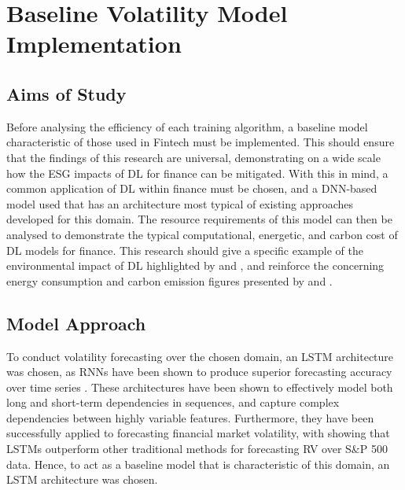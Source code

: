 \documentclass[a4paper, 11pt]{report}
\begin{document}
    \section{Baseline Volatility Model Implementation}
    \label{section: baseline}

    \subsection{Aims of Study}

    Before analysing the efficiency of each training algorithm, a baseline model characteristic of those used in Fintech must be implemented. This should ensure that the findings of this research are universal, demonstrating on a wide scale how the ESG impacts of DL for finance can be mitigated. With this in mind, a common application of DL within finance must be chosen, and a DNN-based model used that has an architecture most typical of existing approaches developed for this domain. The resource requirements of this model can then be analysed to demonstrate the typical computational, energetic, and carbon cost of DL models for finance. This research should give a specific example of the environmental impact of DL highlighted by \citet{schwartz-2019} and \citet{strubell-2019}, and reinforce the concerning energy consumption and carbon emission figures presented by \citet{hockstad-2018} and \citet{masanet-2020}.


    \subsection{Model Approach}
    \label{section: model-architecture}

    To conduct volatility forecasting over the chosen domain, an LSTM architecture was chosen, as RNNs have been shown to produce superior forecasting accuracy over time series \citep{fjellstrom-2022}. These architectures have been shown to effectively model both long and short-term dependencies in sequences, and capture complex dependencies between highly variable features. Furthermore, they have been successfully applied to forecasting financial market volatility, with \citet{bucci-2020} showing that LSTMs outperform other traditional methods for forecasting RV over S\&P 500 data. Hence, to act as a baseline model that is characteristic of this domain, an LSTM architecture was chosen.
\end{document}
